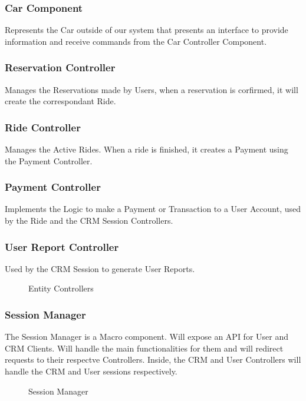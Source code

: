 \documentclass[a4paper]{article}
\begin{document}
\subsubsection{Car Component}
Represents the Car outside of our system that presents an interface to provide information and receive commands from the Car Controller Component.
\subsubsection{Reservation Controller}
Manages the Reservations made by Users, when a reservation is corfirmed, it will create the correspondant Ride.
\subsubsection{Ride Controller}
Manages the Active Rides. When a ride is finished, it creates a Payment using the Payment Controller.
\subsubsection{Payment Controller}
Implements the Logic to make a Payment or Transaction to a User Account, used by the Ride and the CRM Session Controllers.
\subsubsection{User Report Controller}
Used by the CRM Session to generate User Reports.
\begin{figure}[h]
\centering
\vspace*{\fill}
\noindent{}%
\caption {Entity Controllers}
\vspace*{0.5cm}
\end{figure}
\subsubsection{Session Manager}
The Session Manager is a Macro component. Will expose an API for User and CRM Clients. Will handle the main functionalities for them and will redirect requests to their respectve Controllers. Inside, the CRM and User Controllers will handle the CRM and User sessions respectively.
\newline
\begin{figure}[h]
\centering
\vspace*{\fill}
\noindent{}%
\caption {Session Manager}
\vspace*{0.5cm}
\end{figure}
\end{document}
